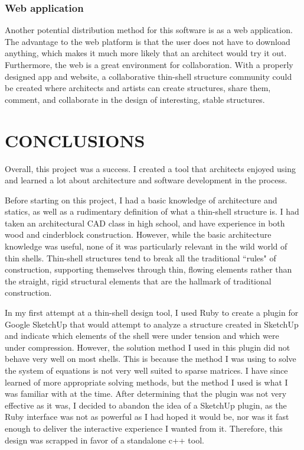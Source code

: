 \documentclass{thesis}
\begin{document}
\subsection{Web application}
Another potential distribution method for this software is as a web application.  The advantage to the web platform is that the
user does not have to download anything, which makes it much more likely that an architect would try it out.  Furthermore, the
web is a great environment for collaboration.  With a properly designed app and website, a collaborative thin-shell structure
community could be created where architects and artists can create structures, share them, comment, and collaborate in the
design of interesting, stable structures.



\chapter{CONCLUSIONS}
Overall, this project was a success.  I created a tool that architects enjoyed using and learned a lot about architecture and
software development in the process.

Before starting on this project, I had a basic knowledge of architecture and statics, as well as a rudimentary definition of what
a thin-shell structure is.  I had taken an architectural CAD class in high school, and have experience in both wood and cinderblock
construction.  However, while the basic architecture knowledge was useful, none of it was particularly relevant in the wild world
of thin shells.  Thin-shell structures tend to break all the traditional ``rules" of construction, supporting themselves through
thin, flowing elements rather than the straight, rigid structural elements that are the hallmark of traditional construction.

In my first attempt at a thin-shell design tool, I used Ruby to create a plugin for Google SketchUp that would attempt to analyze
a structure created in SketchUp and indicate which elements of the shell were under tension and which were under compression.
However, the solution method I used in this plugin did not behave very well on most shells.  This is because the method I was
using to solve the system of equations is not very well suited to sparse matrices.  I have since learned of more appropriate
solving methods, but the method I used is what I was familiar with at the time.  After determining that the plugin was not
very effective as it was, I decided to abandon the idea of a SketchUp plugin, as the Ruby interface was not as powerful as I had
hoped it would be, nor was it fast enough to deliver the interactive experience I wanted from it.  Therefore, this design was
scrapped in favor of a standalone c++ tool.
\end{document}
